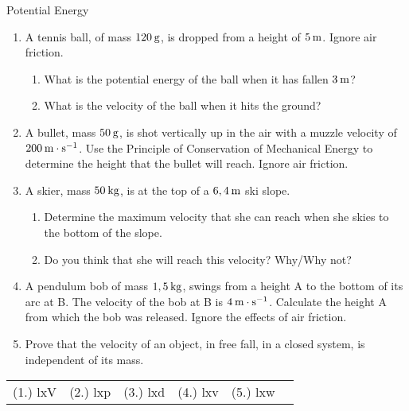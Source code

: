 \begin{exercises}{Potential Energy }
            \nopagebreak \noindent
            \label{m38786*id70623}\begin{enumerate}[noitemsep, label=\textbf{\arabic*}. ] 
            \label{m38786*uid95}\item A tennis ball, of mass $120\phantom{\rule{2pt}{0ex}}\text{g}$, is dropped from a height of $5\phantom{\rule{2pt}{0ex}}\text{m}$. Ignore air friction.
\label{m38786*id70639}\begin{enumerate}[noitemsep, label=\textbf{\alph*}. ] 
            \label{m38786*uid96}\item What is the potential energy of the ball when it has fallen $3\phantom{\rule{2pt}{0ex}}\text{m}$?
\label{m38786*uid97}\item What is the velocity of the ball when it hits the ground?
\end{enumerate}
                \label{m38786*uid98}\item A bullet, mass $50\phantom{\rule{2pt}{0ex}}\text{g}$, is shot vertically up in the air with a muzzle velocity of $200\phantom{\rule{2pt}{0ex}}\text{m}\ensuremath{\cdot}\text{s}{}^{-1}$. Use the Principle of Conservation of Mechanical Energy to determine the height that the bullet will reach. Ignore air friction.\newline
\label{m38786*uid99}\item A skier, mass $50\phantom{\rule{2pt}{0ex}}\text{kg}$, is at the top of a $6,4\phantom{\rule{2pt}{0ex}}\text{m}$ ski slope.
\label{m38786*id70721}\begin{enumerate}[noitemsep, label=\textbf{\alph*}. ] 
            \label{m38786*uid100}\item Determine the maximum velocity that she can reach when she skies to the bottom of the slope.
\label{m38786*uid101}\item Do you think that she will reach this velocity? Why/Why not?
\end{enumerate}
                \label{m38786*uid102}\item A pendulum bob of mass $1,5\phantom{\rule{2pt}{0ex}}\text{kg}$, swings from a height A to the bottom of its arc at B. The velocity of the bob at B is $4\phantom{\rule{2pt}{0ex}}\text{m}\ensuremath{\cdot}\text{s}{}^{-1}$. Calculate the height A from which the bob was released. Ignore the effects of air friction.\newline
\label{m38786*uid103}\item Prove that the velocity of an object, in free fall, in a closed system, is independent of its mass.\newline
\end{enumerate}
    \label{m38786*cid8}
\practiceinfo
 \par \begin{tabular}[h]{cccccc}
 (1.) lxV  &  (2.) lxp  &  (3.) lxd  &  (4.) lxv  &  (5.) lxw  & \end{tabular}
\end{exercises}
